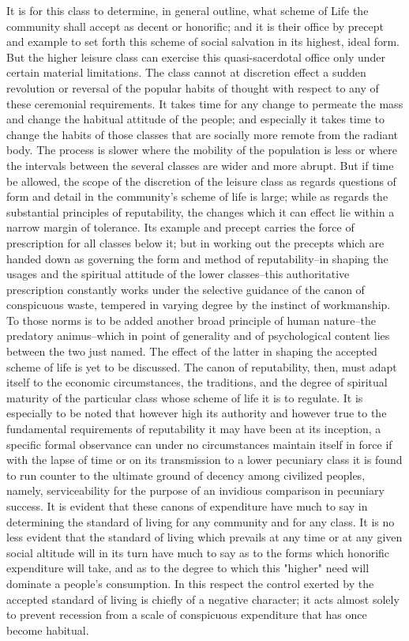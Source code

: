 \documentclass[12pt]{report}
\begin{document}
It is for this class to determine, in general outline, what scheme of
Life the community shall accept as decent or honorific; and it is
their office by precept and example to set forth this scheme of social
salvation in its highest, ideal form. But the higher leisure class
can exercise this quasi-sacerdotal office only under certain material
limitations. The class cannot at discretion effect a sudden revolution
or reversal of the popular habits of thought with respect to any of
these ceremonial requirements. It takes time for any change to permeate
the mass and change the habitual attitude of the people; and especially
it takes time to change the habits of those classes that are socially
more remote from the radiant body. The process is slower where the
mobility of the population is less or where the intervals between the
several classes are wider and more abrupt. But if time be allowed, the
scope of the discretion of the leisure class as regards questions of
form and detail in the community's scheme of life is large; while as
regards the substantial principles of reputability, the changes which
it can effect lie within a narrow margin of tolerance. Its example and
precept carries the force of prescription for all classes below it; but
in working out the precepts which are handed down as governing the form
and method of reputability--in shaping the usages and the spiritual
attitude of the lower classes--this authoritative prescription
constantly works under the selective guidance of the canon of
conspicuous waste, tempered in varying degree by the instinct of
workmanship. To those norms is to be added another broad principle of
human nature--the predatory animus--which in point of generality and of
psychological content lies between the two just named. The effect of the
latter in shaping the accepted scheme of life is yet to be discussed.
The canon of reputability, then, must adapt itself to the economic
circumstances, the traditions, and the degree of spiritual maturity
of the particular class whose scheme of life it is to regulate. It is
especially to be noted that however high its authority and however true
to the fundamental requirements of reputability it may have been at
its inception, a specific formal observance can under no circumstances
maintain itself in force if with the lapse of time or on its
transmission to a lower pecuniary class it is found to run counter
to the ultimate ground of decency among civilized peoples, namely,
serviceability for the purpose of an invidious comparison in pecuniary
success. It is evident that these canons of expenditure have much to
say in determining the standard of living for any community and for any
class. It is no less evident that the standard of living which prevails
at any time or at any given social altitude will in its turn have much
to say as to the forms which honorific expenditure will take, and as
to the degree to which this "higher" need will dominate a people's
consumption. In this respect the control exerted by the accepted
standard of living is chiefly of a negative character; it acts almost
solely to prevent recession from a scale of conspicuous expenditure that
has once become habitual.
\end{document}

